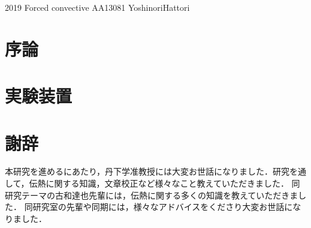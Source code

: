 \documentclass[a4paper,12pt,oneside]{jbook}
\begin{document}
\thesistitleone
	{2019} %
	{Forced convective} %
	{AA13081} %
	{Yoshinori}{Hattori} %

\tableofcontents
\chapter{序論}


\chapter{実験装置}


%

%

%

%

%

%

\chapter*{謝辞}

本研究を進めるにあたり，丹下学准教授には大変お世話になりました．研究を通して，伝熱に関する知識，文章校正など様々なこと教えていただきました．
同研究テーマの古和達也先輩には，伝熱に関する多くの知識を教えていただきました．
同研究室の先輩や同期には，様々なアドバイスをくださり大変お世話になりました．
\end{document}
